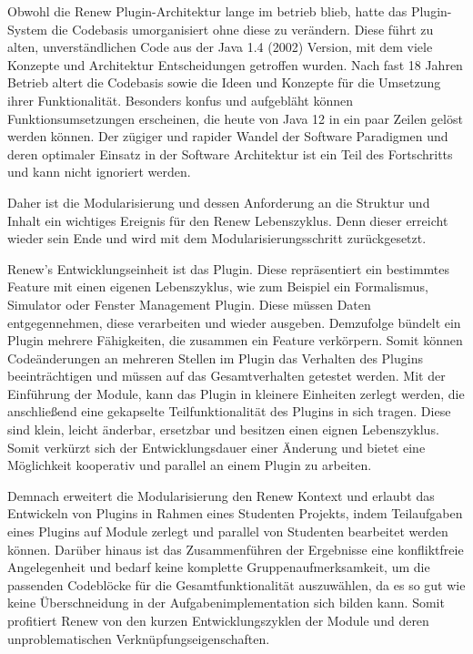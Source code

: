 Obwohl die Renew Plugin-Architektur lange im betrieb blieb, hatte das Plugin-System die Codebasis umorganisiert ohne diese zu verändern. Diese führt zu alten, unverständlichen Code aus der Java 1.4 (2002) Version, mit dem viele Konzepte und Architektur Entscheidungen getroffen wurden. Nach fast 18 Jahren Betrieb altert die Codebasis sowie die Ideen und Konzepte für die Umsetzung ihrer Funktionalität. Besonders konfus und aufgebläht können Funktionsumsetzungen erscheinen, die heute von Java 12 in ein paar Zeilen gelöst werden können. Der zügiger und rapider Wandel der Software Paradigmen und deren optimaler Einsatz in der Software Architektur ist ein Teil des Fortschritts und kann nicht ignoriert werden. 


Daher ist die Modularisierung und dessen Anforderung an die Struktur und Inhalt ein wichtiges Ereignis für den Renew Lebenszyklus. Denn dieser erreicht wieder sein Ende und wird mit dem Modularisierungsschritt zurückgesetzt. \bigbreak


Renew's Entwicklungseinheit ist das Plugin. Diese repräsentiert ein bestimmtes Feature mit einen eigenen Lebenszyklus, wie zum Beispiel ein Formalismus, Simulator oder Fenster Management Plugin. Diese müssen Daten entgegennehmen, diese verarbeiten und wieder ausgeben. Demzufolge bündelt ein Plugin mehrere Fähigkeiten, die zusammen ein Feature verkörpern. Somit können Codeänderungen an mehreren Stellen im Plugin das Verhalten des Plugins beeinträchtigen und müssen auf das Gesamtverhalten getestet werden. Mit der Einführung der Module, kann das Plugin in kleinere Einheiten zerlegt werden, die anschließend eine gekapselte Teilfunktionalität des Plugins in sich tragen. Diese sind klein, leicht änderbar, ersetzbar und besitzen einen eignen Lebenszyklus. Somit verkürzt sich der Entwicklungsdauer einer Änderung und bietet eine Möglichkeit kooperativ und parallel an einem Plugin zu arbeiten. 


Demnach erweitert die Modularisierung den Renew Kontext und erlaubt das Entwickeln von Plugins in Rahmen eines Studenten Projekts, indem Teilaufgaben eines Plugins auf Module zerlegt und parallel von Studenten bearbeitet werden können. Darüber hinaus ist das Zusammenführen der Ergebnisse eine konfliktfreie Angelegenheit und bedarf keine komplette Gruppenaufmerksamkeit, um die passenden Codeblöcke für die Gesamtfunktionalität auszuwählen, da es so gut wie keine Überschneidung in der Aufgabenimplementation sich bilden kann. Somit profitiert Renew von den kurzen Entwicklungszyklen der Module und deren unproblematischen Verknüpfungseigenschaften. 


